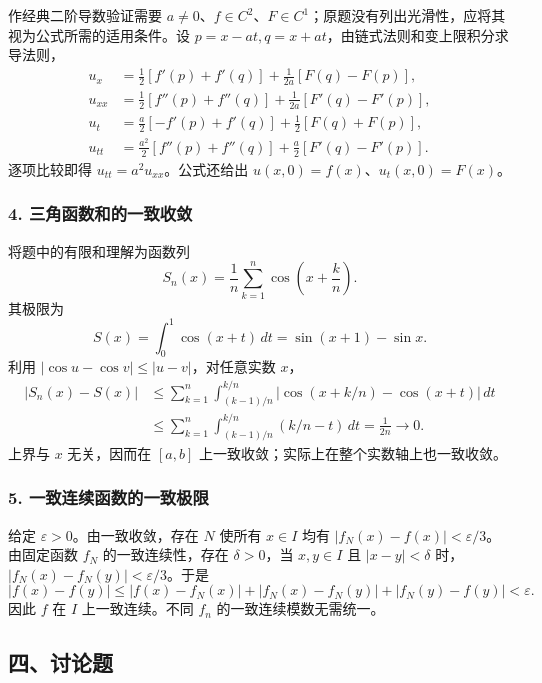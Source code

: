 \documentclass[11pt,fontset=fandol]{ctexart}
\begin{document}
作经典二阶导数验证需要
\(a\ne0\)、\(f\in C^2\)、\(F\in C^1\)；原题没有列出光滑性，应将其视为公式所需的适用条件。设
\(p=x-at,q=x+at\)，由链式法则和变上限积分求导法则， \[
\begin{aligned}
u_x&=\frac12[f'(p)+f'(q)]+\frac1{2a}[F(q)-F(p)],\\
u_{xx}&=\frac12[f''(p)+f''(q)]+\frac1{2a}[F'(q)-F'(p)],\\
u_t&=\frac a2[-f'(p)+f'(q)]+\frac12[F(q)+F(p)],\\
u_{tt}&=\frac{a^2}2[f''(p)+f''(q)]+\frac a2[F'(q)-F'(p)].
\end{aligned}
\] 逐项比较即得 \(u_{tt}=a^2u_{xx}\)。公式还给出
\(u(x,0)=f(x)\)、\(u_t(x,0)=F(x)\)。

\subsubsection{4.
三角函数和的一致收敛}\label{ux4e09ux89d2ux51fdux6570ux548cux7684ux4e00ux81f4ux6536ux655b}

将题中的有限和理解为函数列 \[
S_n(x)=\frac1n\sum_{k=1}^n\cos\left(x+\frac kn\right).
\] 其极限为 \[
S(x)=\int_0^1\cos(x+t)\,dt=\sin(x+1)-\sin x.
\] 利用 \(|\cos u-\cos v|\le|u-v|\)，对任意实数 \(x\)， \[
\begin{aligned}
|S_n(x)-S(x)|
&\le\sum_{k=1}^n\int_{(k-1)/n}^{k/n}
|\cos(x+k/n)-\cos(x+t)|\,dt\\
&\le\sum_{k=1}^n\int_{(k-1)/n}^{k/n}(k/n-t)\,dt
=\frac1{2n}\to0.
\end{aligned}
\] 上界与 \(x\) 无关，因而在 \([a,b]\)
上一致收敛；实际上在整个实数轴上也一致收敛。

\subsubsection{5.
一致连续函数的一致极限}\label{ux4e00ux81f4ux8fdeux7eedux51fdux6570ux7684ux4e00ux81f4ux6781ux9650}

给定 \(\varepsilon>0\)。由一致收敛，存在 \(N\) 使所有 \(x\in I\) 均有
\(|f_N(x)-f(x)|<\varepsilon/3\)。由固定函数 \(f_N\) 的一致连续性，存在
\(\delta>0\)，当 \(x,y\in I\) 且 \(|x-y|<\delta\)
时，\(|f_N(x)-f_N(y)|<\varepsilon/3\)。于是 \[
|f(x)-f(y)|\le|f(x)-f_N(x)|+|f_N(x)-f_N(y)|+|f_N(y)-f(y)|<\varepsilon.
\] 因此 \(f\) 在 \(I\) 上一致连续。不同 \(f_n\) 的一致连续模数无需统一。

\subsection{四、讨论题}\label{ux56dbux8ba8ux8bbaux9898}
\end{document}
